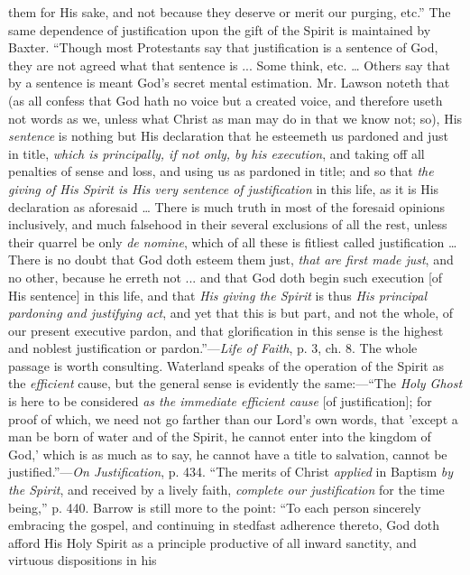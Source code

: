 them for His sake, and not because they deserve or merit our purging,
etc.'' The same dependence of justification upon the gift of the
Spirit is maintained by Baxter. ``Though most Protestants say that
justification is a sentence of God, they are not agreed what that
sentence is ... Some think, etc. … Others say that by a sentence is
meant God's secret mental estimation. Mr. Lawson noteth that (as all
confess that God hath no voice but a created voice, and therefore
useth not words as we, unless what Christ as man may do in that we
know not; so), His \emph{sentence} is nothing but His declaration
that he esteemeth us pardoned and just in title, \emph{which is
principally, if not only, by his execution}, and taking off all
penalties of sense and loss, and using us as pardoned in title; and so
that \emph{the giving of His Spirit is His very sentence of justification}
in this life, as it is His declaration as aforesaid … There is much
truth in most of the foresaid opinions inclusively, and much falsehood
in their several exclusions of all the rest, unless their quarrel be
only \emph{de nomine}, which of all these is fitliest called
justification … There is no doubt that God doth esteem them just, \emph{that
are first made just}, and no other, because he erreth not ... and
that God doth begin such execution [of His sentence] in this life, and
that \emph{His giving the Spirit} is thus \emph{His principal pardoning
and justifying act}, and yet that this is but part, and not the
whole, of our present executive pardon, and that glorification in this
sense is the highest and noblest justification or pardon.''—\emph{Life
of Faith}, p. 3, ch. 8. The whole passage is worth consulting.
Waterland speaks of the operation of the Spirit as the \emph{efficient}
cause, but the general sense is evidently the same:—``The \emph{Holy
Ghost} is here to be considered \emph{as the immediate efficient cause}
[of justification]; for proof of which, we need not go farther than
our Lord's own words, that 'except a man be born of water and of the
Spirit, he cannot enter into the kingdom of God,' which is as much as
to say, he cannot have a title to salvation, cannot be
justified.''—\emph{On Justification}, p. 434. ``The merits
of Christ \emph{applied} in Baptism \emph{by the Spirit}, and received
by a lively faith, \emph{complete our justification} for the time
being,'' p. 440. Barrow is still more to the point: ``To each
person sincerely embracing the gospel, and continuing in stedfast
adherence thereto, God doth afford His Holy Spirit as a principle
productive of all inward sanctity, and virtuous dispositions in his
